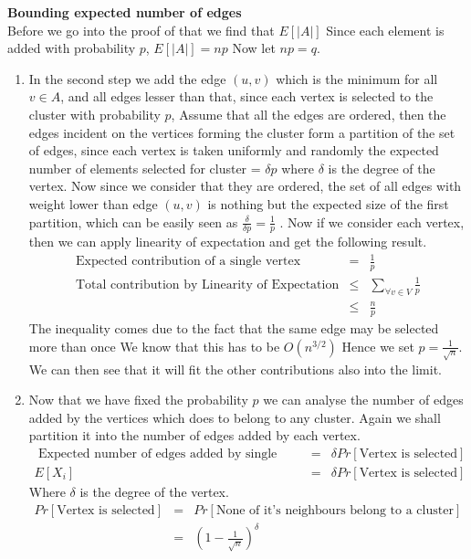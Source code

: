 \documentclass{assignment}
\begin{document}
\begin{problemlist}
\begin{problem}
\begin{answer}
\textbf{Bounding expected number of edges} \\
Before we go into the proof of that we find that $E[|A|]$
Since each element is added with probability $p$, $E[|A|]=np$ Now let $np=q$.  


\begin{enumerate}
\item In the second step we add the edge $(u,v)$ which is the minimum for all $v \in A$, and all edges lesser than that, since each vertex is selected to the cluster with probability $p$, Assume that all the edges are ordered, then the edges incident on the vertices forming the cluster form a partition of the set of edges, since each vertex is taken uniformly and randomly the expected number of elements selected for cluster = $\delta p$ where $\delta$ is the degree of the vertex. Now since we consider that they are ordered, the set of all edges with weight lower than edge $(u,v)$ is nothing but the expected size of the first partition, which can be easily seen as $\frac{\delta}{\delta p} = \frac{1}{p}$ . Now if we consider each vertex, then we can apply linearity of expectation and get the following result. 
\begin{eqnarray}
\textrm{Expected contribution of a single vertex } & = &\frac{1}{p} \\
\textrm{Total contribution by Linearity of Expectation} & \leq & \sum_{\forall v \in V} \frac{1}{p} \\
 & \leq & \frac{n}{p} 
\end{eqnarray}
The inequality comes due to the fact that the same edge may be selected more than once
We know that this has to be $O(n^{3/2})$ Hence we set $p=\frac{1}{\sqrt{n}}$. We can then see that it will fit the other contributions also into the limit.

\item Now that we have fixed the probability $p$ we can analyse the number of edges added by the vertices which does to belong to any cluster. Again we shall partition it into the number of edges added by each vertex.
\begin{eqnarray}
\textrm{ Expected number of edges added by single vertex} & = & \delta  Pr[\textrm{Vertex is selected}] \\
E[X_i] & = & \delta  Pr[\textrm{Vertex is selected}]
\end{eqnarray}
Where $\delta$ is the degree of the vertex. 
\begin{eqnarray}
Pr[\textrm{Vertex is selected}] & = & Pr [\textrm{None of it's neighbours belong to a cluster}] \\
& = & \left( 1 - \frac{1}{\sqrt{n}} \right) ^ \delta
\end{eqnarray}


\end{enumerate}
\end{answer}
\end{problem}
\end{problemlist}
\end{document}
